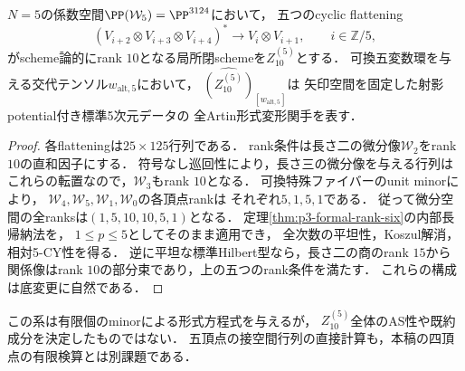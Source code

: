 \begin{corollary}[五頂点ambientの可換点の形式方程式]
\label{cor:p4-formal-rank-ten}
$N=5$の係数空間$\PP(\mathcal W_5)=\PP^{3124}$において，
五つのcyclic flattening
\[
 (V_{i+2}\otimes V_{i+3}\otimes V_{i+4})^*
   \longrightarrow V_i\otimes V_{i+1},
 \qquad i\in\mathbb Z/5,
\]
がscheme論的にrank $10$となる局所閉schemeを$Z_{10}^{(5)}$とする．
可換五変数環を与える交代テンソル$w_{\mathrm{alt},5}$において，
$\widehat{(Z_{10}^{(5)})}_{[w_{\mathrm{alt},5}]}$は
矢印空間を固定した射影potential付き標準5次元データの
全Artin形式変形関手を表す．
\end{corollary}
\begin{proof}
各flatteningは$25\times125$行列である．
rank条件は長さ二の微分像$\mathcal W_2$をrank $10$の直和因子にする．
符号なし巡回性により，長さ三の微分像を与える行列は
これらの転置なので，$\mathcal W_3$もrank $10$となる．
可換特殊ファイバーのunit minorにより，
$\mathcal W_4,\mathcal W_5,\mathcal W_1,\mathcal W_0$の各頂点rankは
それぞれ$5,1,5,1$である．
従って微分空間の全ranksは$(1,5,10,10,5,1)$となる．
定理\ref{thm:p3-formal-rank-six}の内部長帰納法を，
$1\le p\le5$としてそのまま適用でき，
全次数の平坦性，Koszul解消，相対5-CY性を得る．
逆に平坦な標準Hilbert型なら，長さ二の商のrank $15$から
関係像はrank $10$の部分束であり，上の五つのrank条件を満たす．
これらの構成は底変更に自然である．
\end{proof}

この系は有限個のminorによる形式方程式を与えるが，
$Z_{10}^{(5)}$全体のAS性や既約成分を決定したものではない．
五頂点の接空間行列の直接計算も，本稿の四頂点の有限検算とは別課題である．
